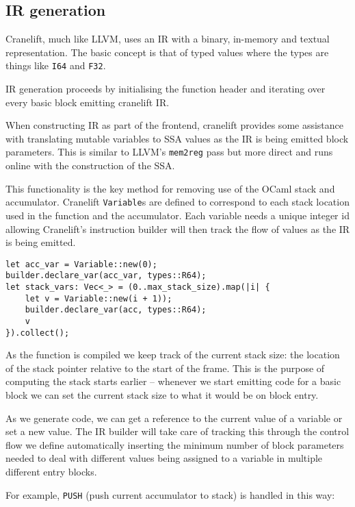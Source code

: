 \subsection{IR generation} \label{opt-irgen}

Cranelift, much like LLVM, uses an IR with a binary, in-memory and textual representation. The
basic concept is that of typed values where the types are things like \texttt{I64} and
\texttt{F32}.

IR generation proceeds by initialising the function header and iterating over every basic block
emitting cranelift IR.

When constructing IR as part of the frontend, cranelift provides some assistance with
translating mutable variables to SSA values as the IR is being emitted block parameters.
This is similar to LLVM's \texttt{mem2reg} pass but more direct and runs online with the
construction
of the SSA.

This functionality is the key method for removing use of the OCaml stack and accumulator. Cranelift
\texttt{Variable}s are defined to correspond to each stack location used in the function and the
accumulator.
Each variable needs a unique integer id allowing Cranelift's instruction builder will then track
the
flow of values as the IR is being emitted.

\begin{verbatim}
let acc_var = Variable::new(0);
builder.declare_var(acc_var, types::R64);
let stack_vars: Vec<_> = (0..max_stack_size).map(|i| {
    let v = Variable::new(i + 1));
    builder.declare_var(acc, types::R64);
    v
}).collect();
\end{verbatim}

As the function is compiled we keep track of the current stack size: the location of the stack
pointer relative to the start of the frame. This is the purpose of computing the stack starts
earlier -- whenever we start emitting code for a basic block we can set the current stack size to
what it would be on block entry.

As we generate code, we can get a reference to the current value of a variable or set a new value.
The IR builder will take care of tracking this through the control flow we define automatically
inserting the minimum number of block parameters needed to deal with different values being
assigned
to a variable in multiple different entry blocks.

For example, \texttt{PUSH} (push current accumulator to stack) is handled in this way:

